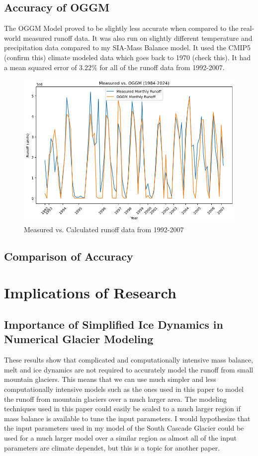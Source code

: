 \documentclass{article}
\begin{document}
\subsection{Accuracy of OGGM}
The OGGM Model proved to be slightly less accurate when compared to the real-world measured runoff data. It was also run on slightly different 
temperature and precipitation data compared to my SIA-Mass Balance model. It used the CMIP5 (confirm this) climate modeled data which goes 
back to 1970 (check this). It had a mean squared error of 3.22\% for all of the runoff data from 1992-2007.
\begin{figure}[h!]
    \centering
    \includegraphics[width=\textwidth]{Plots/oggm_vs_measured.png}
    \caption{Measured vs. Calculated runoff data from 1992-2007}
    \label{fig:oggm_vs_measured}
\end{figure}
\FloatBarrier
\subsection{Comparison of Accuracy}

\section{Implications of Research}
\subsection{Importance of Simplified Ice Dynamics in Numerical Glacier Modeling}
These results show that complicated and computationally intensive mass balance, melt and ice dynamics are not required to accurately model the 
runoff from small mountain glaciers. This means that we can use much simpler and less computationally intensive models such as the ones used 
in this paper to model the runoff from mountain glaciers over a much larger area. The modeling techniques used in this paper could easily be 
scaled to a much larger region if mass balance is available to tune the input parameters. I would hypothesize that the input parameters used 
in my model of the South Cascade Glacier could be used for a much larger model over a similar region as almost all of the input parameters are 
climate dependet, but this is a topic for another paper. 
\end{document}
